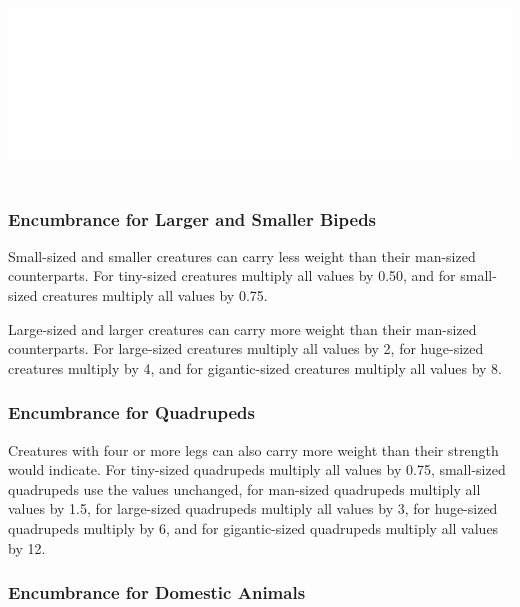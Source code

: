\begin{multicols}{2}

\noindent\includegraphics[width=\columnwidth, height=2in]{testblock.pdf}

\subsubsection*{Encumbrance for Larger and Smaller Bipeds}

Small-sized and smaller creatures can carry less weight than their man-sized counterparts.  For tiny-sized creatures multiply all values by 0.50, and for small-sized creatures multiply all values by 0.75.  

Large-sized and larger creatures can carry more weight than their man-sized counterparts.  For large-sized creatures multiply all values by 2, for huge-sized creatures multiply by 4, and for gigantic-sized creatures multiply all values by 8.  
 
\subsubsection*{Encumbrance for Quadrupeds}

Creatures with four or more legs can also carry more weight than their strength would indicate.  For tiny-sized quadrupeds multiply all values by 0.75, small-sized quadrupeds use the values unchanged, for man-sized quadrupeds multiply all values by 1.5, for large-sized quadrupeds multiply all values by 3, for huge-sized quadrupeds multiply by 6, and for gigantic-sized quadrupeds multiply all values by 12.  

\subsubsection*{Encumbrance for Domestic Animals}


\end{multicols}
